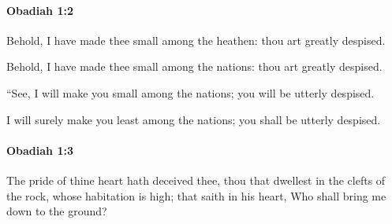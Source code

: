 		\paragraph{Obadiah 1:2} %
			\label{OBADIAH-1-2}

			Behold, I have made thee small among the heathen: thou art greatly despised.

			\begin{versebox}
					\item[BHS] 
					\item[LXX] 
					\item[ASV] Behold, I have made thee small among the nations: thou art greatly despised.
					\item[NIV] “See, I will make you small among the nations; you will be utterly despised.
					\item[NRSV] I will surely make you least among the nations; you shall be utterly despised.
			\end{versebox}

		\paragraph{Obadiah 1:3} %
			\label{OBADIAH-1-3}

			The pride of thine heart hath deceived thee, thou that dwellest in the clefts of the rock, whose habitation is high; that saith in his heart, Who shall bring me down to the ground?

